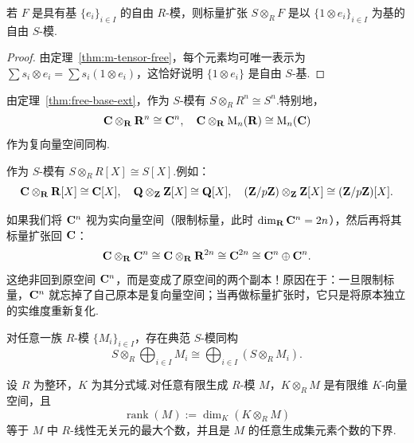 \begin{theorem}\label{thm:free-base-ext}
若 $F$ 是具有基 $\{e_i\}_{i \in I}$ 的自由 $R$-模，则标量扩张 $S \otimes_R F$ 是以 $\{1 \otimes e_i\}_{i \in I}$ 为基的自由 $S$-模.
\end{theorem}

\begin{proof}
由定理~\ref{thm:m-tensor-free}，每个元素均可唯一表示为 $\sum s_i \otimes e_i = \sum s_i (1 \otimes e_i)$，这恰好说明 $\{1 \otimes e_i\}$ 是自由 $S$-基.
\end{proof}

\begin{example}\label{ex:rn-cn-ext}
由定理~\ref{thm:free-base-ext}，作为 $S$-模有 $S \otimes_R R^n \cong S^n$.特别地，
\[
  \mathbf{C} \otimes_{\mathbf{R}} \mathbf{R}^n \cong \mathbf{C}^n, \quad \mathbf{C} \otimes_{\mathbf{R}} \mathrm{M}_n(\mathbf{R}) \cong \mathrm{M}_n(\mathbf{C})
\]
作为复向量空间同构.
\end{example}

\begin{example}\label{ex:poly-base-ext}
作为 $S$-模有 $S \otimes_R R[X] \cong S[X]$.例如：
\[
  \mathbf{C} \otimes_{\mathbf{R}} \mathbf{R}[X] \cong \mathbf{C}[X], \quad \mathbf{Q} \otimes_{\mathbf{Z}} \mathbf{Z}[X] \cong \mathbf{Q}[X], \quad (\mathbf{Z}/p\mathbf{Z}) \otimes_{\mathbf{Z}} \mathbf{Z}[X] \cong (\mathbf{Z}/p\mathbf{Z})[X].
\]
\end{example}

\begin{example}\label{ex:cn-restrict-extend}
如果我们将 $\mathbf{C}^n$ 视为实向量空间（限制标量，此时 $\dim_{\mathbf{R}} \mathbf{C}^n = 2n$），然后再将其标量扩张回 $\mathbf{C}$：
\[
  \mathbf{C} \otimes_{\mathbf{R}} \mathbf{C}^n \cong \mathbf{C} \otimes_{\mathbf{R}} \mathbf{R}^{2n} \cong \mathbf{C}^{2n} \cong \mathbf{C}^n \oplus \mathbf{C}^n.
\]
这绝非回到原空间 $\mathbf{C}^n$，而是变成了原空间的两个副本！原因在于：一旦限制标量，$\mathbf{C}^n$ 就忘掉了自己原本是复向量空间；当再做标量扩张时，它只是将原本独立的实维度重新复化.
\end{example}

\begin{theorem}\label{thm:direct-sum-base-ext}
对任意一族 $R$-模 $\{M_i\}_{i \in I}$，存在典范 $S$-模同构
\[
  S \otimes_R \bigoplus_{i \in I} M_i \cong \bigoplus_{i \in I} (S \otimes_R M_i).
\]
\end{theorem}

\begin{theorem}\label{thm:domain-rank}
设 $R$ 为整环，$K$ 为其分式域.对任意有限生成 $R$-模 $M$，$K \otimes_R M$ 是有限维 $K$-向量空间，且
\[
  \operatorname{rank}(M) := \dim_K(K \otimes_R M)
\]
等于 $M$ 中 $R$-线性无关元的最大个数，并且是 $M$ 的任意生成集元素个数的下界.
\end{theorem}

